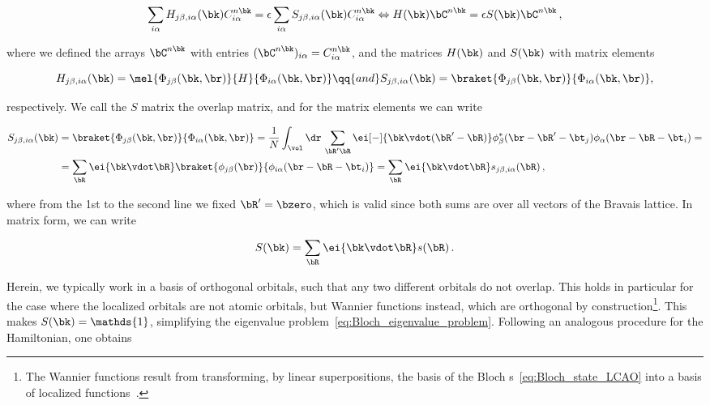 \begin{equation}
    \label{eq:Bloch_eigenvalue_problem}
    \sum_{i \alpha}  H_{j \beta, i \alpha}(\bk) C_{i \alpha}^{n \bk} = \epsilon \sum_{i \alpha}  S_{j \beta, i \alpha}(\bk) C_{i \alpha}^{n \bk} \Leftrightarrow H(\bk) \bC^{n \bk} = \epsilon S(\bk) \bC^{n \bk}\,,
\end{equation}


\noindent where we defined the arrays $\bC^{n \bk}$ with entries $(\bC^{n \bk})_{i \alpha} = C_{i \alpha}^{n \bk}$, and the matrices $H(\bk)$ and $S(\bk)$ with matrix elements

\begin{equation}
    H_{j \beta, i \alpha}(\bk) = \mel{\Phi_{j \beta} (\bk,\br)}{H}{\Phi_{i \alpha} (\bk,\br)} \qq{and} S_{j \beta, i \alpha}(\bk) = \braket{\Phi_{j \beta} (\bk,\br)}{\Phi_{i \alpha} (\bk,\br)} ,
\end{equation}

\noindent respectively.
We call the $S$ matrix the overlap matrix, and for the matrix elements we can write

\begin{equation}
    \label{eq:Bloch_overlap_definition}
    \begin{split}
        S_{j \beta, i \alpha}(\bk) &= \braket{\Phi_{j \beta} (\bk,\br)}{\Phi_{i \alpha} (\bk,\br)} = \frac{1}{N} \int_{\vol} \dr\, \sum_{\bR'\bR} \ei[-]{\bk \vdot (\bR'  - \bR) } \phi_\beta^*(\br - \bR' - \bt_j) \phi_\alpha (\br - \bR - \bt_i) = \\
        &= \sum_{\bR} \ei{\bk \vdot \bR} \braket{\phi_{j \beta} (\br)}{\phi_{i \alpha} (\br - \bR - \bt_i)} = \sum_{\bR} \ei{\bk \vdot \bR} s_{j \beta, i \alpha} (\bR)\,,
    \end{split}
\end{equation}

\noindent where from the 1st to the second line we fixed $\bR' = \bzero $, which is valid since both sums are over all vectors of the Bravais lattice.
In matrix form, we can write

\begin{equation}
    S(\bk) = \sum_{\bR} \ei{\bk \vdot \bR} s(\bR)\,.
\end{equation}

\noindent Herein, we typically work in a basis of orthogonal orbitals, such that any two different orbitals do not overlap.
This holds in particular for the case where the localized orbitals are not atomic orbitals, but Wannier functions instead, which are orthogonal by construction\footnote{The Wannier functions result from transforming, by linear superpositions, the basis of the Bloch \wf s~\eqref{eq:Bloch_state_LCAO} into a basis of localized functions~\cite{Marzari_2012}.\label{fn:Wannier_functions}}.
This makes $S(\bk) = \mathds{1}$, simplifying the eigenvalue problem~\eqref{eq:Bloch_eigenvalue_problem}.
Following an analogous procedure for the Hamiltonian, one obtains

